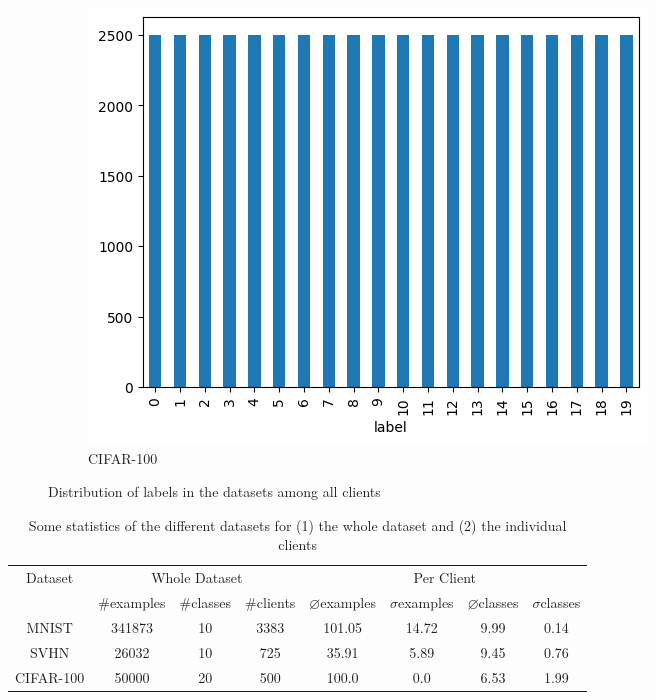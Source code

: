 \begin{figure}[tb]
\begin{subfigure}{0.3\textwidth}
		\includegraphics[width=\textwidth]{Bilder/cifar_label_distribution.png}
		\caption{CIFAR-100}
	\end{subfigure}
	\caption{Distribution of labels in the datasets among all clients}
\end{figure}

\begin{table}[tb]
	\centering
	\begin{tabular}{|c|c|c|c|c|c|c|c|}
		\hline
		\multirow{2}{4em}{Dataset} & \multicolumn{3}{|c|}{Whole Dataset} & \multicolumn{4}{|c|}{Per Client} \\
		\cline{2-8}
		& \#examples & \#classes & \#clients & $\diameter$examples & $\sigma$examples & $\diameter$classes & $\sigma$classes \\
		\hline
		MNIST & 341873 & 10 & 3383 & 101.05 & 14.72 & 9.99 & 0.14 \\
		SVHN & 26032 & 10 & 725 & 35.91 & 5.89 & 9.45 & 0.76 \\
		CIFAR-100 & 50000 & 20 & 500 & 100.0 & 0.0 & 6.53 & 1.99 \\
		\hline
	\end{tabular}
	\caption{Some statistics of the different datasets for (1) the whole dataset and (2) the individual clients}
	\label{tab:dataset-statistics}
\end{table}

